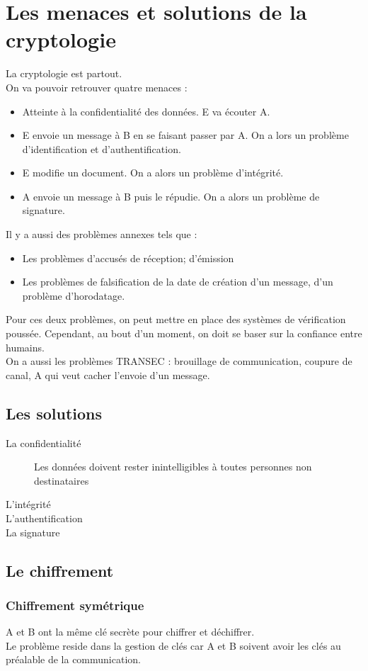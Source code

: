 \section{Les menaces et solutions de la cryptologie}
La cryptologie est partout.\\
On va pouvoir retrouver quatre menaces :
\begin{itemize}
 \item Atteinte à la confidentialité des données. E va écouter A.
 \item E envoie un message à B en se faisant passer par A. On a lors un problème d'identification et d'authentification.
 \item E modifie un document. On a alors un problème d'intégrité.
 \item A envoie un message à B puis le répudie. On a alors un problème de signature.
\end{itemize}
Il y a aussi des problèmes annexes tels que :
\begin{itemize}
 \item Les problèmes d'accusés de réception; d'émission
 \item Les problèmes de falsification de la date de création d'un message, d'un problème d'horodatage.
\end{itemize}
Pour ces deux problèmes, on peut mettre en place des systèmes de vérification poussée. Cependant, au bout d'un moment, on doit se baser sur la confiance entre humains.\\
On a aussi les problèmes TRANSEC : brouillage de communication, coupure de canal, A qui veut cacher l'envoie d'un message.
\subsection{Les solutions}
\begin{description}
 \item[La confidentialité] Les données doivent rester inintelligibles à toutes personnes non destinataires
 \item[L'intégrité] 
 \item[L'authentification] 
 \item[La signature] 
\end{description}
\subsection{Le chiffrement}
\subsubsection{Chiffrement symétrique}
A et B ont la même clé secrète pour chiffrer et déchiffrer.\\
Le problème reside dans la gestion de clés car A et B soivent avoir les clés au préalable de la communication.
